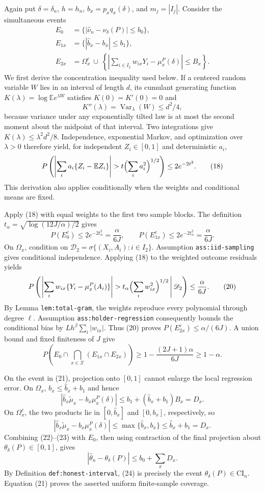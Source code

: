 Again put \(\delta=\delta_n\), \(h=h_n\), \(b_x=p_xq_x(\delta)\), and \(m_j=|I_j|\).  Consider the simultaneous events
\[
 \begin{split}
 E_0&=\{|\widehat\nu_n-\nu_\delta(P)|\leq b_0\},\\
 E_{1x}&=\{|\widehat b_x-b_x|\leq b_1\},\\
 E_{2x}&=\Omega_x^c\ \cup\
 \left\{\left|\sum_{i\in I_2}w_{ix}Y_i-\mu_x^P(\delta)\right|\leq B_x\right\}.
 \end{split} \tag{17}
\]
We first derive the concentration inequality used below.  If a centered random variable \(W\) lies in an interval of length \(d\), its cumulant generating function \(K(\lambda)=\log\mathbb E e^{\lambda W}\) satisfies \(K(0)=K'(0)=0\) and
\[
 K''(\lambda)=\operatorname{Var}_{\lambda}(W)\leq d^2/4,
\]
because variance under any exponentially tilted law is at most the second moment about the midpoint of that interval.  Two integrations give \(K(\lambda)\leq\lambda^2d^2/8\).  Independence, exponential Markov, and optimization over \(\lambda>0\) therefore yield, for independent \(Z_i\in[0,1]\) and deterministic \(a_i\),
\[
 P\left(\left|\sum_i a_i\{Z_i-\mathbb EZ_i\}\right|>
 t\Bigl(\sum_i a_i^2\Bigr)^{1/2}\right)\leq2e^{-2t^2}. \tag{18}
\]
This derivation also applies conditionally when the weights and conditional means are fixed.

Apply (18) with equal weights to the first two sample blocks.  The definition \(t_\alpha=\sqrt{\log(12J/\alpha)/2}\) gives
\[
 P(E_0^c)\leq2e^{-2t_\alpha^2}=\frac{\alpha}{6J},
 \qquad
 P(E_{1x}^c)\leq2e^{-2t_\alpha^2}=\frac{\alpha}{6J}. \tag{19}
\]
On \(\Omega_x\), condition on \(\mathscr D_2=\sigma\{(X_i,A_i):i\in I_2\}\).  Assumption \texttt{ass:iid-sampling} gives conditional independence.  Applying (18) to the weighted outcome residuals yields
\[
 P\left(\left.\left|\sum_iw_{ix}\{Y_i-\mu_x^P(A_i)\}\right|>
 t_\alpha\Bigl(\sum_iw_{ix}^2\Bigr)^{1/2}\,\right|\mathscr D_2\right)
 \leq\frac{\alpha}{6J}. \tag{20}
\]
By Lemma \texttt{lem:total-gram}, the weights reproduce every polynomial through degree \(\ell\).  Assumption \texttt{ass:holder-regression} consequently bounds the conditional bias by \(Lh^\beta\sum_i|w_{ix}|\).  Thus (20) proves \(P(E_{2x}^c)\leq\alpha/(6J)\).  A union bound and fixed finiteness of \(J\) give
\[
 P\left(E_0\cap\bigcap_{x\in\mathcal X}(E_{1x}\cap E_{2x})\right)
 \geq1-\frac{(2J+1)\alpha}{6J}\geq1-\alpha. \tag{21}
\]

On the event in (21), projection onto \([0,1]\) cannot enlarge the local regression error.  On \(\Omega_x\), \(b_x\leq\widehat b_x+b_1\) and hence
\[
 |\widehat b_x\widetilde\mu_x-b_x\mu_x^P(\delta)|
 \leq b_1+(\widehat b_x+b_1)B_x=D_x. \tag{22}
\]
On \(\Omega_x^c\), the two products lie in \([0,\widehat b_x]\) and \([0,b_x]\), respectively, so
\[
 |\widehat b_x\widetilde\mu_x-b_x\mu_x^P(\delta)|
 \leq\max\{\widehat b_x,b_x\}\leq\widehat b_x+b_1=D_x. \tag{23}
\]
Combining (22)--(23) with \(E_0\), then using contraction of the final projection about \(\theta_\delta(P)\in[0,1]\), gives
\[
 |\widehat\theta_n-\theta_\delta(P)|\leq b_0+\sum_xD_x. \tag{24}
\]
By Definition \texttt{def:honest-interval}, (24) is precisely the event \(\theta_\delta(P)\in\mathrm{CI}_n\).  Equation (21) proves the asserted uniform finite-sample coverage.

